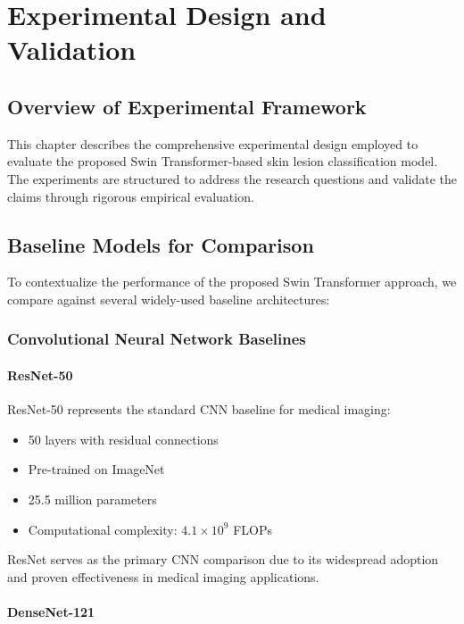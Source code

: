 \chapter{Experimental Design and Validation}
\label{ch:experimental_setup}

\section{Overview of Experimental Framework}

This chapter describes the comprehensive experimental design employed to evaluate the proposed Swin Transformer-based skin lesion classification model. The experiments are structured to address the research questions and validate the claims through rigorous empirical evaluation.

\section{Baseline Models for Comparison}

To contextualize the performance of the proposed Swin Transformer approach, we compare against several widely-used baseline architectures:

\subsection{Convolutional Neural Network Baselines}

\subsubsection{ResNet-50}

ResNet-50 represents the standard CNN baseline for medical imaging:

\begin{itemize}
    \item 50 layers with residual connections
    \item Pre-trained on ImageNet
    \item 25.5 million parameters
    \item Computational complexity: $4.1 \times 10^9$ FLOPs
\end{itemize}

ResNet serves as the primary CNN comparison due to its widespread adoption and proven effectiveness in medical imaging applications.

\subsubsection{DenseNet-121}

